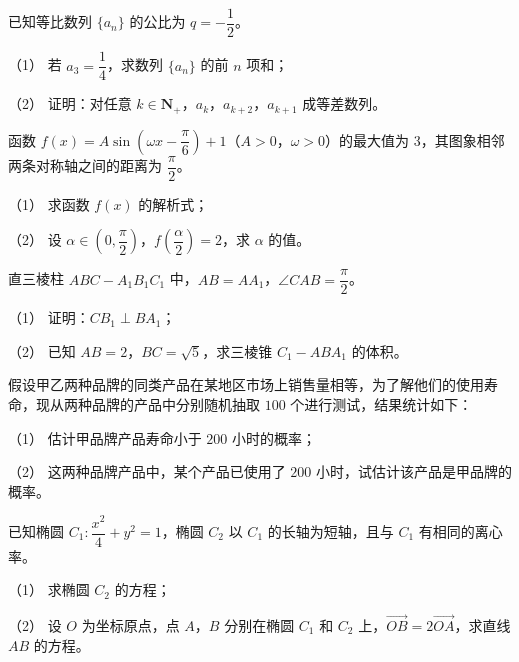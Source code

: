 \begin{question}
已知等比数列 $\{a_n\}$ 的公比为 $q=-\dfrac12$。

（1） 若 $a_3=\dfrac14$，求数列 $\{a_n\}$ 的前 $n$ 项和；

（2） 证明：对任意 $k\in\mathbf N_+$，$a_k$，$a_{k+2}$，$a_{k+1}$ 成等差数列。

\end{question}
\begin{question}
函数 $f(x)=A\sin\left(\omega x-\dfrac\pi6\right)+1$（$A>0$，$\omega>0$）的最大值为 $3$，其图象相邻两条对称轴之间的距离为 $\dfrac\pi2$。

（1） 求函数 $f(x)$ 的解析式；

（2） 设 $\alpha\in\left(0,\dfrac\pi2\right)$，$f\left(\dfrac\alpha2\right)=2$，求 $\alpha$ 的值。

\Needspace{0.4\textheight}
\end{question}
\begin{question}
直三棱柱 $ABC-A_1B_1C_1$ 中，$AB=AA_1$，$\angle CAB=\dfrac\pi2$。

（1） 证明：$CB_1\perp BA_1$；

（2） 已知 $AB=2$，$BC=\sqrt5$，求三棱锥 $C_1-ABA_1$ 的体积。
\nopagebreak[4]
\begin{center}\end{center}
\nopagebreak[4]
\Needspace{0.4\textheight}
\end{question}
\begin{question}
假设甲乙两种品牌的同类产品在某地区市场上销售量相等，为了解他们的使用寿命，现从两种品牌的产品中分别随机抽取 $100$ 个进行测试，结果统计如下：
\nopagebreak[4]
\begin{center}\end{center}
\nopagebreak[4]
（1） 估计甲品牌产品寿命小于 $200$ 小时的概率；

（2） 这两种品牌产品中，某个产品已使用了 $200$ 小时，试估计该产品是甲品牌的概率。

\end{question}
\begin{question}
已知椭圆 $C_1:\dfrac{x^2}4+y^2=1$，椭圆 $C_2$ 以 $C_1$ 的长轴为短轴，且与 $C_1$ 有相同的离心率。

（1） 求椭圆 $C_2$ 的方程；

（2） 设 $O$ 为坐标原点，点 $A$，$B$ 分别在椭圆 $C_1$ 和 $C_2$ 上，$\overrightarrow{OB}=2\overrightarrow{OA}$，求直线 $AB$ 的方程。

\end{question}
